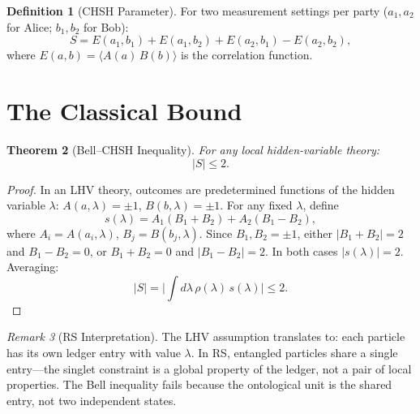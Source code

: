 \documentclass[12pt,a4paper]{article}
\newtheorem{theorem}{Theorem}[section]
\theoremstyle{definition}
\newtheorem{definition}[theorem]{Definition}
\theoremstyle{remark}
\newtheorem{remark}[theorem]{Remark}
\begin{document}
\begin{definition}[CHSH Parameter]
\label{def:chsh}
For two measurement settings per party ($a_1, a_2$ for Alice;
$b_1, b_2$ for Bob):
\begin{equation}
  S = E(a_1, b_1) + E(a_1, b_2)
  + E(a_2, b_1) - E(a_2, b_2),
\end{equation}
where $E(a, b) = \langle A(a)\, B(b) \rangle$ is the
correlation function.
\end{definition}

\section{The Classical Bound}
\label{sec:classical}

\begin{theorem}[Bell--CHSH Inequality]
\label{thm:bell}
For any local hidden-variable theory:
\begin{equation}
  \boxed{|S| \leq 2.}
\end{equation}
\end{theorem}

\begin{proof}
In an LHV theory, outcomes are predetermined functions of the
hidden variable $\lambda$: $A(a, \lambda) = \pm 1$,
$B(b, \lambda) = \pm 1$.  For any fixed $\lambda$, define
\begin{equation}
  s(\lambda) = A_1(B_1 + B_2) + A_2(B_1 - B_2),
\end{equation}
where $A_i = A(a_i, \lambda)$, $B_j = B(b_j, \lambda)$.
Since $B_1, B_2 = \pm 1$, either $|B_1 + B_2| = 2$ and
$B_1 - B_2 = 0$, or $B_1 + B_2 = 0$ and
$|B_1 - B_2| = 2$.  In both cases $|s(\lambda)| = 2$.
Averaging:
\begin{equation}
  |S| = \biggl|\int d\lambda\, \rho(\lambda)\,
  s(\lambda)\biggr| \leq 2.
\end{equation}
\end{proof}

\begin{remark}[RS Interpretation]
\label{rem:rs-lhv}
The LHV assumption translates to: each particle has its own
ledger entry with value $\lambda$.  In RS, entangled particles
share a single entry---the singlet constraint is a global
property of the ledger, not a pair of local properties.  The
Bell inequality fails because the ontological unit is the
shared entry, not two independent states.
\end{remark}
\end{document}
